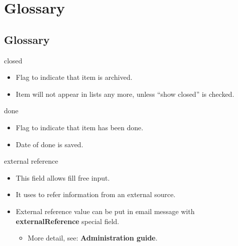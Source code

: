 \documentclass[letterpaper,10pt,english]{sphinxmanual}
\begin{document}
\chapter{Glossary}
\label{index:glossary}

\section{Glossary}
\label{Glossary:glossary}\label{Glossary::doc}\begin{description}
\item[{closed}] \leavevmode{}\label{Glossary:term-closed}
\end{description}
\begin{itemize}
\item {} 
Flag to indicate that item is archived.

\item {} 
Item will not appear in lists any more, unless “show closed” is checked.

\end{itemize}
\begin{description}
\item[{done}] \leavevmode{}\label{Glossary:term-done}
\end{description}
\begin{itemize}
\item {} 
Flag to indicate that item has been done.

\item {} 
Date of done is saved.

\end{itemize}
\begin{description}
\item[{external reference}] \leavevmode{}\label{Glossary:term-external-reference}
\end{description}
\begin{itemize}
\item {} 
This field allows fill free input.

\item {} 
It uses to refer information from an external source.

\item {} 
External reference value can be put in email message with \textbf{externalReference} special field.
\begin{itemize}
\item {} 
More detail, see: \textbf{Administration guide}.

\end{itemize}

\end{itemize}
\end{document}
